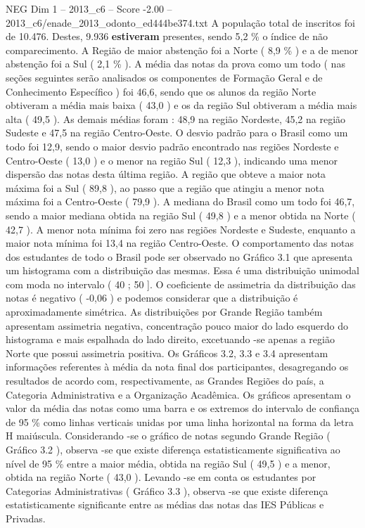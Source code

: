 \begin{textsample}{NEG Dim 1 – 2013\_c6 – Score -2.00 – 2013\_c6/enade\_2013\_odonto\_ed444be374.txt}
A população total de inscritos foi de 10.476.
Destes, 9.936 \textbf{estiveram} presentes, sendo 5,2 \% o índice de não comparecimento.
A Região de maior abstenção foi a Norte ( 8,9 \% ) e a de menor abstenção foi a Sul ( 2,1 \% ).
A média das notas da prova como um todo ( nas seções seguintes serão analisados os componentes de Formação Geral e de Conhecimento Específico ) foi 46,6, sendo que os alunos da região Norte obtiveram a média mais baixa ( 43,0 ) e os da região Sul obtiveram a média mais alta ( 49,5 ).
As demais médias foram : 48,9 na região Nordeste, 45,2 na região Sudeste e 47,5 na região Centro-Oeste.
O desvio padrão para o Brasil como um todo foi 12,9, sendo o maior desvio padrão encontrado nas regiões Nordeste e Centro-Oeste ( 13,0 ) e o menor na região Sul ( 12,3 ), indicando uma menor dispersão das notas desta última região.
A região que obteve a maior nota máxima foi a Sul ( 89,8 ), ao passo que a região que atingiu a menor nota máxima foi a Centro-Oeste ( 79,9 ).
A mediana do Brasil como um todo foi 46,7, sendo a maior mediana obtida na região Sul ( 49,8 ) e a menor obtida na Norte ( 42,7 ).
A menor nota mínima foi zero nas regiões Nordeste e Sudeste, enquanto a maior nota mínima foi 13,4 na região Centro-Oeste.
O comportamento das notas dos estudantes de todo o Brasil pode ser observado no Gráfico 3.1 que apresenta um histograma com a distribuição das mesmas.
Essa é uma distribuição unimodal com moda no intervalo ( 40 ; 50 ].
O coeficiente de assimetria da distribuição das notas é negativo ( -0,06 ) e podemos considerar que a distribuição é aproximadamente simétrica.
As distribuições por Grande Região também apresentam assimetria negativa, concentração pouco maior do lado esquerdo do histograma e mais espalhada do lado direito, excetuando -se apenas a região Norte que possui assimetria positiva.
Os Gráficos 3.2, 3.3 e 3.4 apresentam informações referentes à média da nota final dos participantes, desagregando os resultados de acordo com, respectivamente, as Grandes Regiões do país, a Categoria Administrativa e a Organização Acadêmica.
Os gráficos apresentam o valor da média das notas como uma barra e os extremos do intervalo de confiança de 95 \% como linhas verticais unidas por uma linha horizontal na forma da letra H maiúscula.
Considerando -se o gráfico de notas segundo Grande Região ( Gráfico 3.2 ), observa -se que existe diferença estatisticamente significativa ao nível de 95 \% entre a maior média, obtida na região Sul ( 49,5 ) e a menor, obtida na região Norte ( 43,0 ).
Levando -se em conta os estudantes por Categorias Administrativas ( Gráfico 3.3 ), observa -se que existe diferença estatisticamente significante entre as médias das notas das IES Públicas e Privadas.

\end{textsample}
